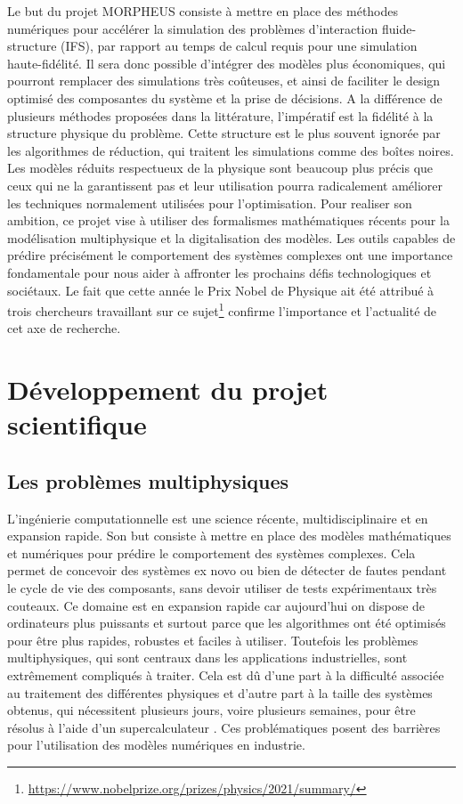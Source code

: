 \documentclass[12pt, french]{article}
\begin{document}
	Le but du projet MORPHEUS consiste à mettre en place des méthodes numériques
	pour accélérer la simulation des problèmes d'interaction fluide-structure (IFS), par rapport au temps de calcul requis pour une simulation haute-fidélité. Il sera donc possible d'intégrer des modèles plus économiques, qui pourront remplacer des simulations très coûteuses, et ainsi de faciliter le design optimisé des composantes du système et la prise de décisions. A la différence de plusieurs méthodes proposées dans la littérature, l'impératif est la fidélité à la structure physique du problème.  Cette structure est le plus souvent ignorée par les algorithmes de réduction, qui traitent les simulations comme des boîtes noires. Les modèles réduits respectueux de la physique sont beaucoup plus précis que ceux qui ne la garantissent pas et leur utilisation pourra radicalement améliorer les techniques normalement utilisées pour l'optimisation. Pour realiser son ambition, ce projet vise à utiliser des formalismes mathématiques récents pour la modélisation multiphysique et la digitalisation des modèles. Les outils capables de prédire précisément le comportement des systèmes complexes ont une importance fondamentale pour nous aider à affronter les prochains défis technologiques et sociétaux. Le fait que cette année le Prix Nobel de Physique ait été attribué à trois chercheurs travaillant sur ce sujet\footnote{\url{https://www.nobelprize.org/prizes/physics/2021/summary/}} confirme
	l'importance et l'actualité de cet axe de recherche.
	
	
	\section{Développement du projet scientifique}
	
	\subsection{Les problèmes multiphysiques}
	L'ingénierie computationnelle est une science récente, multidisciplinaire et en expansion rapide. Son but consiste à mettre en place des modèles mathématiques et numériques pour prédire le comportement des systèmes complexes. Cela permet de concevoir des systèmes ex novo ou bien de détecter de fautes pendant le cycle de vie des composants, sans devoir utiliser de tests expérimentaux très couteaux. Ce domaine est en expansion rapide car aujourd'hui on dispose de ordinateurs plus puissants et surtout parce que les algorithmes ont été optimisés pour être plus rapides, robustes et faciles à utiliser. Toutefois les problèmes multiphysiques, qui sont centraux dans les applications industrielles, sont extrêmement compliqués à traiter. Cela est d\^u d'une part à la difficulté associée au traitement des différentes physiques et d'autre part à la taille des systèmes obtenus, qui nécessitent plusieurs jours, voire plusieurs semaines, pour être résolus à l'aide d'un supercalculateur \cite{keyes2013}. Ces problématiques posent des barrières pour l'utilisation des modèles numériques en industrie. 
	
\end{document}
